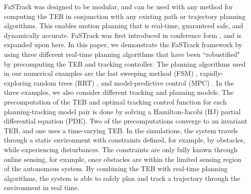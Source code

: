 FaSTrack was designed to be modular, and can be used with any method for computing the TEB in conjunction with any existing path or trajectory planning algorithms.  
This enables motion planning that is real-time, guaranteed safe, and dynamically accurate. 
FaSTrack was first introduced in conference form \cite{herbert2017fastrack}, and is expanded upon here. In this paper, we demonstrate the FaSTrack framework by using three different real-time planning algorithms that have been ``robustified" by precomputing the TEB and tracking controller. 
The planning algorithms used in our numerical examples are the fast sweeping method (FSM) \cite{Takei2013}, rapidly-exploring random trees (RRT) \cite{Kuffner2000,Kavraki1996}, and model-predictive control (MPC) \cite{Qin2003}. 
In the three examples, we also consider different tracking and planning models.
The precomputation of the TEB and optimal tracking control function for each planning-tracking model pair is done by solving a Hamilton-Jacobi (HJ) partial differential equation (PDE). 
Two of the precomputations converge to an invariant TEB, and one uses a time-varying TEB.
In the simulations, the system travels through a static environment with constraints defined, for example, by obstacles, while experiencing disturbances.
The constraints are only fully known through online sensing, for example, once obstacles are within the limited sensing region of the autonomous system. 
By combining the TEB with real-time planning algorithms, the system is able to safely plan and track a trajectory through the environment in real time. 